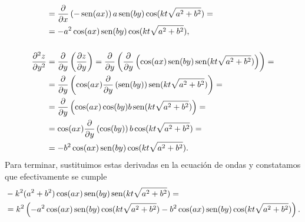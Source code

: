{\begin{align*}
&= \frac{\partial}{\partial x}\left(-\operatorname{sen}(ax)\right)a\operatorname{sen}(by)\cos(kt\sqrt{a^2+b^2}) =\\
&= -a^2\cos(ax)\operatorname{sen}(by)\cos(kt\sqrt{a^2+b^2}),\\[.5cm]
\frac{\partial^2 z}{\partial y^2} &=
\frac{\partial}{\partial y}\left(\frac{\partial z}{\partial y}\right)
= \frac{\partial}{\partial y}\left(\frac{\partial}{\partial y}\left(\cos(ax)\operatorname{sen}(by)\operatorname{sen}(kt\sqrt{a^2+b^2})\right)\right)= \\
&= \frac{\partial}{\partial y}\left(\cos(ax)\frac{\partial}{\partial y}\left(\operatorname{sen}(by)\right)\operatorname{sen}(kt\sqrt{a^2+b^2})\right)=\\
&= \frac{\partial}{\partial y}\left(\cos(ax)\cos(by)b\operatorname{sen}(kt\sqrt{a^2+b^2})\right)=\\
&= \cos(ax)\frac{\partial}{\partial y}\left(\cos(by)\right)b\cos(kt\sqrt{a^2+b^2}) =\\
&= -b^2\cos(ax)\operatorname{sen}(by)\cos(kt\sqrt{a^2+b^2}).
\end{align*}
Para terminar, sustituimos estas derivadas en la ecuación de ondas y constatamos que efectivamente se cumple
\begin{align*}
& -k^2(a^2+b^2)\cos(ax)\operatorname{sen}(by)\operatorname{sen}(kt\sqrt{a^2+b^2}) =\\
&= k^2\left(-a^2\cos(ax)\operatorname{sen}(by)\cos(kt\sqrt{a^2+b^2})-b^2\cos(ax)\operatorname{sen}(by)\cos(kt\sqrt{a^2+b^2})\right).
\end{align*}
}



